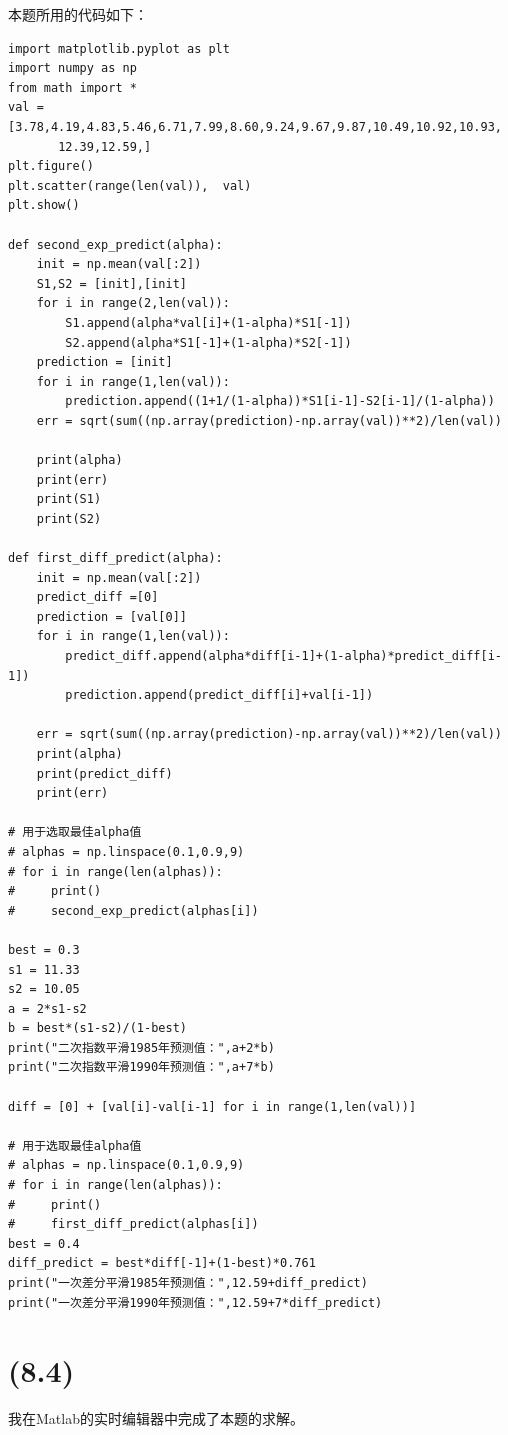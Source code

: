 \documentclass[a4paper]{article}
\begin{document}
本题所用的代码如下：
\begin{lstlisting}[emph={[3]alpha},emphstyle={[3]\color{vscode_parametercolor}},emph={[4]RegressionModel,GameState,MinimaxAgent,AlphaBetaAgent},emphstyle={[4]\color{vscode_classcolor}}]
import matplotlib.pyplot as plt
import numpy as np
from math import *
val = [3.78,4.19,4.83,5.46,6.71,7.99,8.60,9.24,9.67,9.87,10.49,10.92,10.93,
       12.39,12.59,]
plt.figure()
plt.scatter(range(len(val)),  val)
plt.show()

def second_exp_predict(alpha):
    init = np.mean(val[:2])
    S1,S2 = [init],[init]
    for i in range(2,len(val)):
        S1.append(alpha*val[i]+(1-alpha)*S1[-1])
        S2.append(alpha*S1[-1]+(1-alpha)*S2[-1])
    prediction = [init]
    for i in range(1,len(val)):
        prediction.append((1+1/(1-alpha))*S1[i-1]-S2[i-1]/(1-alpha))
    err = sqrt(sum((np.array(prediction)-np.array(val))**2)/len(val))

    print(alpha)
    print(err)
    print(S1)
    print(S2)

def first_diff_predict(alpha):
    init = np.mean(val[:2])
    predict_diff =[0]
    prediction = [val[0]]
    for i in range(1,len(val)):
        predict_diff.append(alpha*diff[i-1]+(1-alpha)*predict_diff[i-1])
        prediction.append(predict_diff[i]+val[i-1])

    err = sqrt(sum((np.array(prediction)-np.array(val))**2)/len(val))
    print(alpha)
    print(predict_diff)
    print(err)

# 用于选取最佳alpha值
# alphas = np.linspace(0.1,0.9,9)
# for i in range(len(alphas)):
#     print()
#     second_exp_predict(alphas[i])

best = 0.3
s1 = 11.33
s2 = 10.05
a = 2*s1-s2
b = best*(s1-s2)/(1-best)
print("二次指数平滑1985年预测值：",a+2*b)
print("二次指数平滑1990年预测值：",a+7*b)

diff = [0] + [val[i]-val[i-1] for i in range(1,len(val))]

# 用于选取最佳alpha值
# alphas = np.linspace(0.1,0.9,9)
# for i in range(len(alphas)):
#     print()
#     first_diff_predict(alphas[i])
best = 0.4
diff_predict = best*diff[-1]+(1-best)*0.761
print("一次差分平滑1985年预测值：",12.59+diff_predict)
print("一次差分平滑1990年预测值：",12.59+7*diff_predict)
\end{lstlisting}
\newpage
\section{(8.4)}
我在Matlab的实时编辑器中完成了本题的求解。
\end{document}
